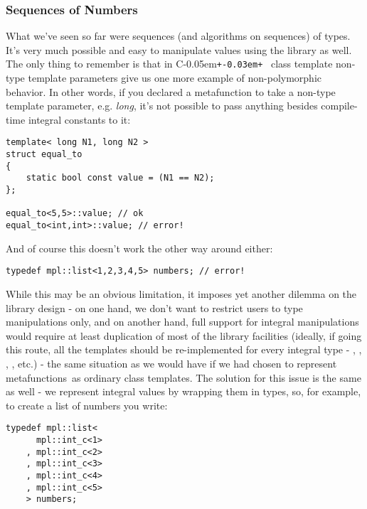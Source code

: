 \documentclass{kapproc}
\newcommand{\Cpp}{C\kern-0.05em\texttt{+\kern-0.03em+}%
}
\newcommand{\mfns}{meta\-func\-tions}
\begin{document}
\subsubsection{Sequences of Numbers}

What we've seen so far were sequences (and algorithms on sequences) of
types. It's very much possible and easy to manipulate values using the
library as well. The only thing to remember is that in \Cpp\ class
template non-type template parameters give us one more example of
non-polymorphic behavior.  In other words, if you declared a
metafunction to take a non-type template parameter, e.g.  \emph{long},
it's not possible to pass anything besides compile-time integral
constants to it:

{\small
\begin{codesamp}\begin{verbatim}
template< long N1, long N2 >
struct equal_to
{
    static bool const value = (N1 == N2);
};

equal_to<5,5>::value; // ok
equal_to<int,int>::value; // error!
\end{verbatim}
\end{codesamp}
}

And of course this doesn't work the other way around either:

{\small
\begin{codesamp}\begin{verbatim}
typedef mpl::list<1,2,3,4,5> numbers; // error!
\end{verbatim}
\end{codesamp}
}

While this may be an obvious limitation, it imposes yet 
another dilemma on the library design - on one hand, we don't 
want to restrict users to type manipulations only, and on another 
hand, full support for integral manipulations would require at 
least duplication of most of the library facilities (ideally, 
if going this route, all the templates should be re-implemented 
for every integral type - , , ,
, etc.) - the same situation as we would have if we 
had chosen to represent \mfns\ as ordinary class templates.
The solution for this issue is the same as well - we represent 
integral values by wrapping them in types, so, for example, to 
create a list of numbers you write:

{\small
\begin{codesamp}\begin{verbatim}
typedef mpl::list<
      mpl::int_c<1>
    , mpl::int_c<2>
    , mpl::int_c<3>
    , mpl::int_c<4>
    , mpl::int_c<5>
    > numbers;
\end{verbatim}
\end{codesamp}
}
\end{document}
